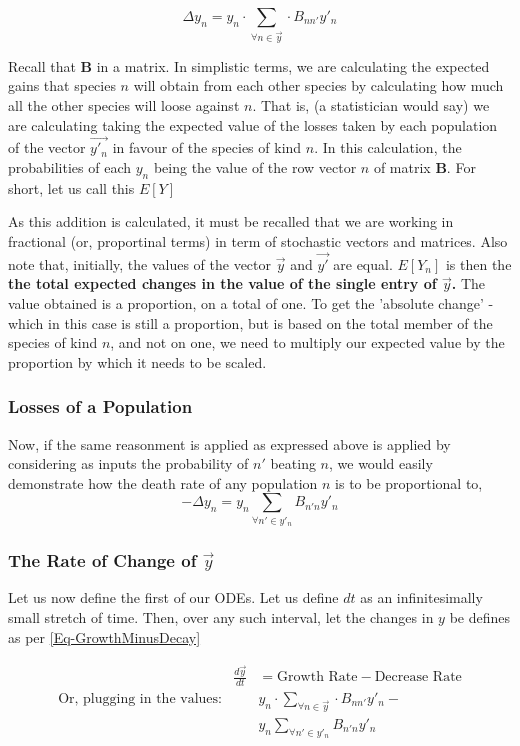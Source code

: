 \documentclass[border=1pt]{article}
\begin{document}
	\begin{equation}
		\Delta y_n = y_n \cdot \sum_{\forall n \in \vec{y}} \cdot B_{nn'} y'_{n}
	\end{equation}


Recall that $\mathbf{B}$ in a matrix. In simplistic terms, we are calculating the expected gains that species $n$ will obtain from each other species by calculating how much all the other species will loose against $n$. That is, (a statistician would say) we are calculating taking the expected value of the losses taken by each population of the vector $\vec{y'_n}$ in favour of the species of kind $n$. In this calculation, the probabilities of each $y_n$ being the value of the row vector $n$ of matrix $\mathbf{B}$. For short, let us call this $E[Y]$

As this addition is calculated, it must be recalled that we are working in fractional (or, proportinal terms) in term of stochastic vectors and matrices. Also note that, initially, the values of the vector $\vec{y}$ and $\vec{y'}$ are equal. $E[Y_n]$ is then the \textbf{the total expected changes in the value of the single entry of $\vec{y}$.} The value obtained is a proportion, on a total of one. To get the 'absolute change' -  which in this case is still a proportion, but is based on the total member of the species of kind $n$, and not on one, we need to multiply our expected value by the proportion by which it needs to be scaled.  
\subsubsection{Losses of a Population}
	Now, if the same reasonment is applied as expressed above is applied by considering as inputs the probability of $n'$ beating $n$, we would easily demonstrate how the death rate of any population $n$ is to be proportional to,
	\begin{equation}
		-\Delta y_n= y_n \sum_{\forall n' \in y'_n} B_{n'n}y'_n
	\end{equation}

\subsubsection{The Rate of Change of $\vec{y}$}
Let us now define the first of our ODEs. Let us define $dt$ as an infinitesimally small stretch of time. Then, over any such interval, let the changes in $y$ be defines as per \autoref{Eq-GrowthMinusDecay}

\begin{eqnarray}
\label{eq:SimpleDTWithSums}
	&\frac{d \vec{y}}{dt}&= \text{Growth Rate} - \text{Decrease Rate}\\
	\text{Or, plugging in the values:}& & y_n \cdot \sum_{\forall n \in \vec{y}} \cdot B_{nn'} y'_{n} -\\ 
	& & y_n \sum_{\forall n' \in y'_n} B_{n'n}y'_n
\end{eqnarray}
\end{document}

